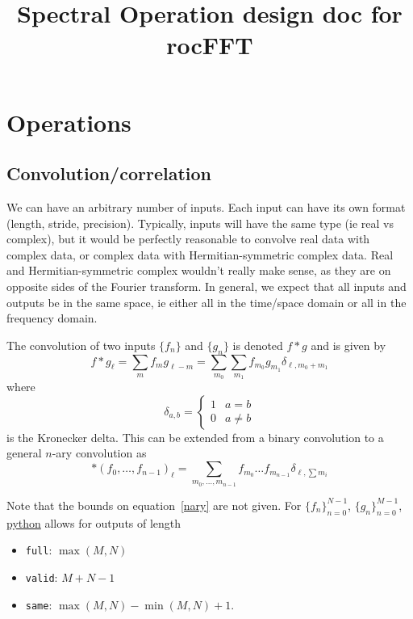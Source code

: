 \documentclass[12pt]{article}
\title{Spectral Operation design doc for rocFFT}
\renewcommand{\(}{\left(}
\renewcommand{\)}{\right)}
\begin{document}
\maketitle

\section{Operations}


\subsection{Convolution/correlation}

We can have an arbitrary number of inputs.  Each input can have its
own format (length, stride, precision).  Typically, inputs will have
the same type (ie real vs complex), but it would be perfectly
reasonable to convolve real data with complex data, or complex data
with Hermitian-symmetric complex data.  Real and Hermitian-symmetric
complex wouldn't really make sense, as they are on opposite sides of
the Fourier transform.  In general, we expect that all inputs and
outputs be in the same space, ie either all in the time/space domain
or all in the frequency domain.

The convolution of two inputs $\{f_n\}$ and $\{g_n\}$ is denoted
$f\ast{}g$ and is given by
\begin{dmath}
  f\ast{}g_\ell
  = \sum_m f_m g_{\ell-m}
  = \sum_{m_0}\sum_{m_1}f_{m_0} g_{m_1} \delta_{\ell, m_0 + m_1}
\end{dmath}
where
\begin{dmath}
  \delta_{a,b} = \begin{cases}
  1  & a=b  \\
  0 & a \neq b
\end{cases}
\end{dmath}
is the Kronecker delta.  This can be extended from a binary convolution
to a general $n$-ary convolution as
\begin{dmath}
  \label{nary}
  \ast{}\(f_0, \dots, f_{n-1} \)_\ell
  = \sum_{m_0, \dots, m_{n-1}} f_{m_0} \dots f_{m_{n-1}}  \delta_{\ell, \sum m_i} 
\end{dmath}

Note that the bounds on equation~\eqref{nary} are not given.  For
$\{f_n\}_{n=0}^{N-1}$, $\{g_n\}_{n=0}^{M-1}$, \href{https://docs.scipy.org/doc/scipy/reference/generated/scipy.signal.fftconvolve.html#scipy.signal.fftconvolve}{python}
allows for outputs of length
\begin{itemize}
\item \texttt{full}: $\max(M,N)$
\item \texttt{valid}: $M+N-1$
\item \texttt{same}:  $\max(M, N) - \min(M, N) + 1$.
\end{itemize}
\end{document}
